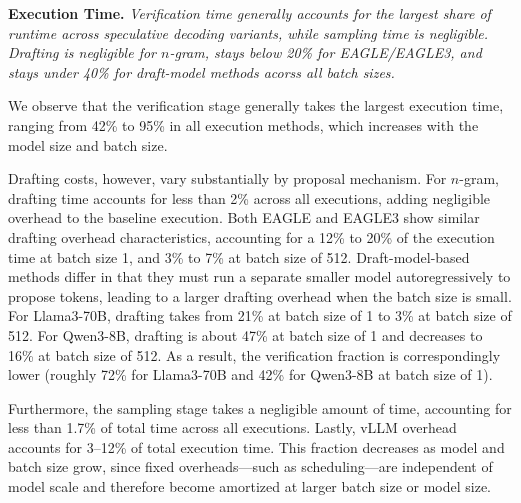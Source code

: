 \documentclass{article}
\begin{document}
\begin{quoting}[leftmargin=1.5em, rightmargin=1.5em, vskip=0pt]
\textbf{Execution Time.}
\emph{Verification time generally accounts for the largest share of runtime across speculative decoding variants, while sampling time is negligible. Drafting is negligible for $n$-gram, stays below 20\% for EAGLE/EAGLE3, and stays under 40\% for draft-model methods acorss all batch sizes.}
\end{quoting}

We observe that the verification stage generally takes the largest execution time, ranging from 42\% to 95\% in all execution methods, which increases with the model size and batch size. 

Drafting costs, however, vary substantially by proposal mechanism. For $n$-gram, drafting time accounts for less than 2\% across all executions, adding negligible overhead to the baseline execution. Both EAGLE and EAGLE3 show similar drafting overhead characteristics, accounting for a 12\% to 20\% of the execution time at batch size 1, and 3\% to 7\% at batch size of 512.
Draft-model-based methods differ in that they must run a separate smaller model autoregressively to propose tokens, leading to a larger drafting overhead when the batch size is small. For Llama3-70B, drafting takes from 21\% at batch size of 1 to 3\% at batch size of 512. For Qwen3-8B, drafting is about 47\% at batch size of 1 and decreases to 16\% at batch size of 512. As a result, the verification fraction is correspondingly lower (roughly 72\% for Llama3-70B and 42\% for Qwen3-8B at batch size of 1). 

Furthermore, the sampling stage takes a negligible amount of time, accounting for less than 1.7\% of total time across all executions. 
Lastly, vLLM overhead accounts for 3–12\% of total execution time. This fraction decreases as model and batch size grow, since fixed overheads—such as scheduling—are independent of model scale and therefore become amortized at larger batch size or model size.
\end{document}
